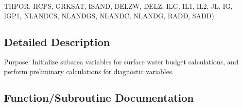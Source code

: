 \begin{DoxyCompactItemize}
T\+H\+P\+O\+R, H\+C\+P\+S, G\+R\+K\+S\+A\+T, I\+S\+A\+N\+D, D\+E\+L\+Z\+W, D\+E\+L\+Z, I\+L\+G, I\+L1, I\+L2, J\+L, I\+G, I\+G\+P1, N\+L\+A\+N\+D\+C\+S, N\+L\+A\+N\+D\+G\+S, N\+L\+A\+N\+D\+C, N\+L\+A\+N\+D\+G, R\+A\+D\+D, S\+A\+D\+D)
\end{DoxyCompactItemize}


\subsection{Detailed Description}
Purpose\+: Initialize subarea variables for surface water budget calculations, and perform preliminary calculations for diagnostic variables. 



\subsection{Function/\+Subroutine Documentation}
\hypertarget{WPREP_8f_a8bd6e495bd4674e569184609d67fa736}{}
